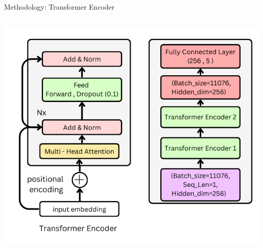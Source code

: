 \begin{frame}{Methodology: Transformer Encoder}
\begin{columns}
        \centering
        \includegraphics[width=\linewidth]{figures/Transformer.png} %
        \vspace{2pt}

    \end{columns}
\end{frame}


